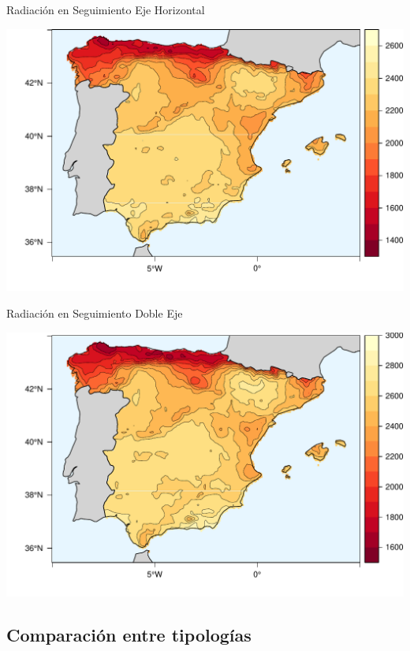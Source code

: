 \documentclass[xcolor={usenames,svgnames,dvipsnames}]{beamer}
\begin{document}
\begin{frame}[label={sec:org3c6c2a3}]{Radiación en Seguimiento Eje Horizontal}
\begin{center}
\includegraphics[width=.9\linewidth]{../figs/HorizKrig.pdf}
\end{center}
\end{frame}



\begin{frame}[label={sec:orgb38a089}]{Radiación en Seguimiento Doble Eje}
\begin{center}
\includegraphics[width=.9\linewidth]{../figs/TwoKrig.pdf}
\end{center}
\end{frame}

\subsection{Comparación entre tipologías}
\label{sec:orgd8e0d0f}
\end{document}
